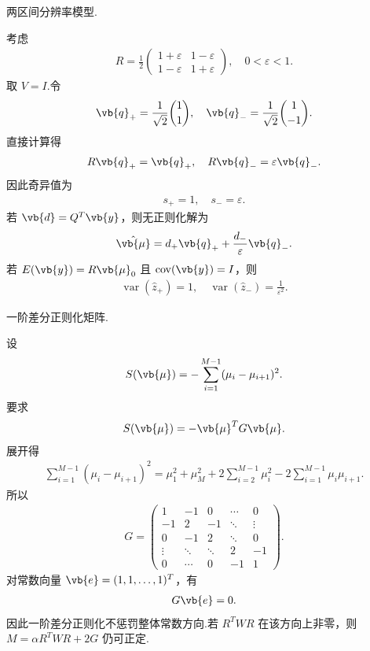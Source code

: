 \begin{exbox}
	两区间分辨率模型.

	考虑
	\begin{align*}
		R=\frac{1}{2}
		\begin{pmatrix}
			1+\varepsilon & 1-\varepsilon\\
			1-\varepsilon & 1+\varepsilon
		\end{pmatrix},
		\quad 0<\varepsilon<1.
	\end{align*}
	取 \(V=I\).令
	\begin{align*}
		\vb{q}_+=\frac{1}{\sqrt{2}}\binom{1}{1},
		\quad
		\vb{q}_-=\frac{1}{\sqrt{2}}\binom{1}{-1}.
	\end{align*}
	直接计算得
	\begin{align*}
		R\vb{q}_+=\vb{q}_+,\quad R\vb{q}_-=\varepsilon\vb{q}_-.
	\end{align*}
	因此奇异值为
	\begin{align*}
		s_+=1,\quad s_-=\varepsilon.
	\end{align*}
	若 \(\vb{d}=Q^T\vb{y}\)，则无正则化解为
	\begin{align*}
		\hat{\vb{\mu}}
		=d_+\vb{q}_++\frac{d_-}{\varepsilon}\vb{q}_-.
	\end{align*}
	若 \(E(\vb{y})=R\vb{\mu}_0\) 且 \(\operatorname{cov}(\vb{y})=I\)，则
	\begin{align*}
		\operatorname{var}(\hat{z}_+)=1,\quad
		\operatorname{var}(\hat{z}_-)=\frac{1}{\varepsilon^2}.
	\end{align*}
\end{exbox}

\begin{exbox}
	一阶差分正则化矩阵.

	设
	\begin{align*}
		S(\vb{\mu})=-\sum_{i=1}^{M-1}(\mu_i-\mu_{i+1})^2.
	\end{align*}
	要求
	\begin{align*}
		S(\vb{\mu})=-\vb{\mu}^TG\vb{\mu}.
	\end{align*}
	展开得
	\begin{align*}
		\sum_{i=1}^{M-1}(\mu_i-\mu_{i+1})^2
		=\mu_1^2+\mu_M^2
		+2\sum_{i=2}^{M-1}\mu_i^2
		-2\sum_{i=1}^{M-1}\mu_i\mu_{i+1}.
	\end{align*}
	所以
	\begin{align*}
		G=
		\begin{pmatrix}
			1 & -1 & 0 & \cdots & 0\\
			-1 & 2 & -1 & \ddots & \vdots\\
			0 & -1 & 2 & \ddots & 0\\
			\vdots & \ddots & \ddots & 2 & -1\\
			0 & \cdots & 0 & -1 & 1
		\end{pmatrix}.
	\end{align*}
	对常数向量 \(\vb{e}=(1,1,\ldots,1)^T\)，有
	\begin{align*}
		G\vb{e}=0.
	\end{align*}
	因此一阶差分正则化不惩罚整体常数方向.若 \(R^TWR\) 在该方向上非零，则 \(M=\alpha R^TWR+2G\) 仍可正定.
\end{exbox}
